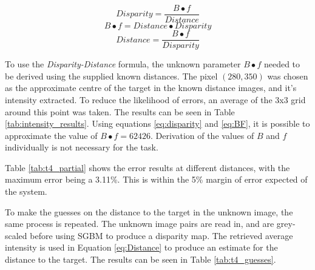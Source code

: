 \documentclass[conference]{IEEEtran}
\begin{document}
\begin{equation} \label{eq:disparity}
Disparity = \frac{B \bullet f}{Distance}
\end{equation}
\begin{equation} \label{eq:BF}
B \bullet f = Distance \bullet Disparity
\end{equation}
\begin{equation}	\label{eq:Distance}
Distance = \frac{B\bullet f}{Disparity}
\end{equation}

To use the \textit{Disparity-Distance} formula, the unknown parameter $B \bullet f$ needed to be derived using the supplied known distances. The pixel $(280,350)$ was chosen as the approximate centre of the target in the known distance images, and it's intensity extracted. To reduce the likelihood of errors, an average of the 3x3 grid around this point was taken. The results can be seen in Table \ref{tab:intensity_results}. Using equations \ref{eq:disparity} and \ref{eq:BF}, it is possible to approximate the value of $B \bullet f = 62426$. Derivation of the values of $B$ and $f$ individually is not necessary for the task. 

Table \ref{tab:t4_partial} shows the error results at different distances, with the maximum error being a 3.11\%. This is within the 5\% margin of error expected of the system.

To make the guesses on the distance to the target in the unknown image, the same process is repeated. The unknown image pairs are read in, and are grey-scaled before using SGBM to produce a disparity map. The retrieved average intensity is used in Equation \ref{eq:Distance} to produce an estimate for the distance to the target. The results can be seen in Table \ref{tab:t4_guesses}. 
\end{document}
